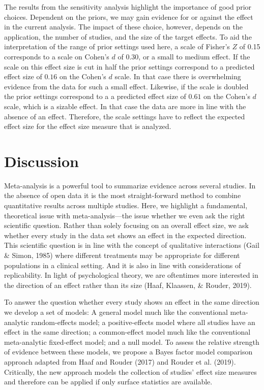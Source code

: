 \documentclass[english,,man]{apa6}
\begin{document}
The results from the sensitivity analysis highlight the importance of good prior choices. Dependent on the priors, we may gain evidence for or against the effect in the current analysis. The impact of these choice, however, depends on the application, the number of studies, and the size of the target effects. To aid the interpretation of the range of prior settings used here, a scale of Fisher's \(Z\) of 0.15 corresponds to a scale on Cohen's \(d\) of \(0.30\), or a small to medium effect. If the scale on this effect size is cut in half the prior settings correspond to a predicted effect size of \(0.16\) on the Cohen's \(d\) scale. In that case there is overwhelming evidence from the data for such a small effect. Likewise, if the scale is doubled the prior settings correspond to a a predicted effect size of \(0.61\) on the Cohen's \(d\) scale, which is a sizable effect. In that case the data are more in line with the absence of an effect. Therefore, the scale settings have to reflect the expected effect size for the effect size measure that is analyzed.

\hypertarget{discussion}{%
\section{Discussion}\label{discussion}}

Meta-analysis is a powerful tool to summarize evidence across several studies. In the absence of open data it is the most straight-forward method to combine quantitative results across multiple studies. Here, we highlight a fundamental, theoretical issue with meta-analysis---the issue whether we even ask the right scientific question. Rather than solely focusing on an overall effect size, we ask whether every study in the data set shows an effect in the expected direction. This scientific question is in line with the concept of qualitative interactions (Gail \& Simon, 1985) where different treatments may be appropriate for different populations in a clinical setting. And it is also in line with considerations of replicability. In light of psychological theory, we are oftentimes more interested in the direction of an effect rather than its size (Haaf, Klaassen, \& Rouder, 2019).

To answer the question whether every study shows an effect in the same direction we develop a set of models: A general model much like the conventional meta-analytic random-effects model; a positive-effects model where all studies have an effect in the same direction; a common-effect model much like the conventional meta-analytic fixed-effect model; and a null model. To assess the relative strength of evidence between these models, we propose a Bayes factor model comparison approach adapted from Haaf and Rouder (2017) and Rouder et al. (2019). Critically, the new approach models the collection of studies' effect size measures and therefore can be applied if only surface statistics are available.
\end{document}
